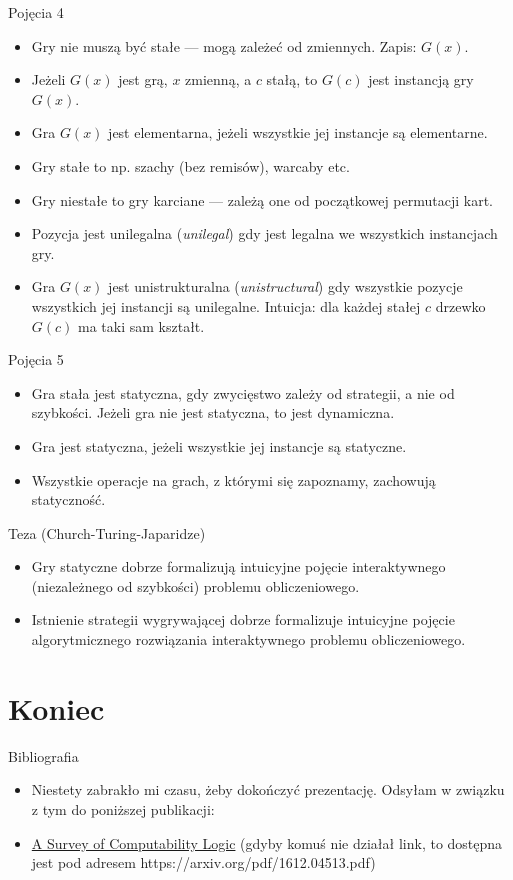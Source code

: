 \documentclass{beamer}
\begin{document}
\begin{frame}{Pojęcia 4}
\begin{itemize}
	\item Gry nie muszą być stałe — mogą zależeć od zmiennych. Zapis: $G(x)$.
	\item Jeżeli $G(x)$ jest grą, $x$ zmienną, a $c$ stałą, to $G(c)$ jest instancją gry $G(x)$.
	\item Gra $G(x)$ jest elementarna, jeżeli wszystkie jej instancje są elementarne.
	\item Gry stałe to np. szachy (bez remisów), warcaby etc.
	\item Gry niestałe to gry karciane — zależą one od początkowej permutacji kart.
	\item Pozycja jest unilegalna (\textit{unilegal}) gdy jest legalna we wszystkich instancjach gry.
	\item Gra $G(x)$ jest unistrukturalna (\textit{unistructural}) gdy wszystkie pozycje wszystkich jej instancji są unilegalne. Intuicja: dla każdej stałej $c$ drzewko $G(c)$ ma taki sam kształt.
\end{itemize}
\end{frame}

\begin{frame}{Pojęcia 5}
\begin{itemize}
	\item Gra stała jest statyczna, gdy zwycięstwo zależy od strategii, a nie od szybkości. Jeżeli gra nie jest statyczna, to jest dynamiczna.
	\item Gra jest statyczna, jeżeli wszystkie jej instancje są statyczne.
	\item Wszystkie operacje na grach, z którymi się zapoznamy, zachowują statyczność.
\end{itemize}
\end{frame}

\begin{frame}{Teza (Church-Turing-Japaridze)}
\begin{itemize}
	\item Gry statyczne dobrze formalizują intuicyjne pojęcie interaktywnego (niezależnego od szybkości) problemu obliczeniowego.
	\item Istnienie strategii wygrywającej dobrze formalizuje intuicyjne pojęcie algorytmicznego rozwiązania interaktywnego problemu obliczeniowego.
\end{itemize}
\end{frame}

\section{Koniec}

\begin{frame}{Bibliografia}
\begin{itemize}
	\item Niestety zabrakło mi czasu, żeby dokończyć prezentację. Odsyłam w związku z tym do poniższej publikacji:
	\item \href{https://arxiv.org/pdf/1612.04513.pdf}{A Survey of Computability Logic} (gdyby komuś nie działał link, to dostępna jest pod adresem https://arxiv.org/pdf/1612.04513.pdf)
\end{itemize}
\end{frame}
\end{document}
